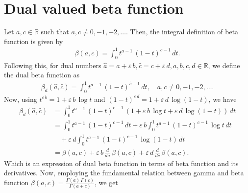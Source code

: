 \documentclass[11pt,a4paper,fleqn]{article}
\numberwithin{equation}{section}
\numberwithin{lemma}{section}
\numberwithin{theorem}{section}
\numberwithin{corollary}{section}
\begin{document}
\section{Dual valued beta function}
Let $a, c \in \mathbb{R}$ such that $a, c \ne 0, -1, -2, \dots$. Then, the integral definition of beta function is given by \cite{emo, edr}
\begin{align}
	\beta (a, c) = \int_{0}^{1} t^{a - 1} \, (1 - t)^{c - 1} \, dt.
\end{align}
Following this, for dual numbers $\widehat{a} = a + \varepsilon \, b, \widehat{c} = c + \varepsilon \, d, a, b, c, d \in \mathbb{R}$, we define the dual beta function as
\begin{align}
	\beta_d (\widehat{a}, \widehat{c}) = \int_{0}^{1} t^{\widehat{a} - 1} \, (1 - t)^{\widehat{c} - 1} \, dt, \quad a, c \ne 0, -1, -2, \dots.
\end{align}
Now, using $t^{\varepsilon \, b}  =  1 + \varepsilon \, b \, \log t$ and $(1 - t)^{\varepsilon \, d} = 1 + \varepsilon \, d \, \log (1 - t)$, we have
\begin{align}
	\beta_d (\widehat{a}, \widehat{c}) & = \int_{0}^{1} t^{{a} - 1} \, (1 - t)^{{c} - 1} \, (1 + \varepsilon \, b \, \log t + \varepsilon \, d \, \log (1 - t)) \, dt\nonumber\\
	& = \int_{0}^{1} t^{{a} - 1} \, (1 - t)^{{c} - 1} \, dt + \varepsilon \, b \int_{0}^{1} t^{{a} - 1} \, (1 - t)^{{c}  - 1} \, \log t \, dt\nonumber\\
	& \quad  + \varepsilon \, d \int_{0}^{1} t^{{a} - 1} \, (1 - t)^{{c} - 1} \, \log (1 - t) \, dt\nonumber\\
	& = \beta (a, c) + \varepsilon \, b \, \frac{d}{d a} \, \beta(a, c)  + \varepsilon \, d \, \frac{d}{d c} \, \beta(a, c).
\end{align}
Which is an expression of dual beta function in terms of beta function and its derivatives. Now, employing the fundamental relation between gamma and beta function $\beta(a, c) = \frac{\Gamma (a) \, \Gamma (c)}{\Gamma (a + c)}$, we get
\end{document}

